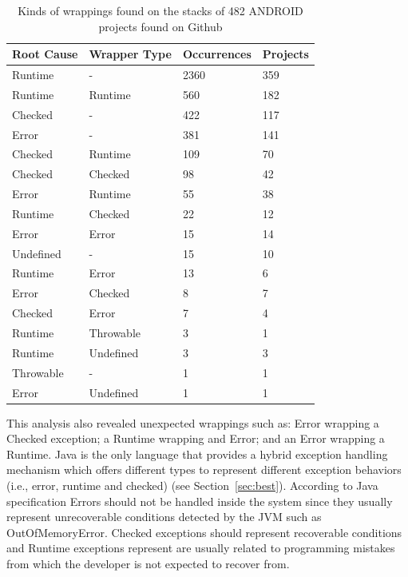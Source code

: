 \documentclass[conference]{IEEEtran}
\begin{document}
\begin{table}
\centering
\begin{tabular}{llll}
    \hline
    \bfseries{Root Cause} & \bfseries{Wrapper Type} & \bfseries{Occurrences} & \bfseries{Projects} \\
    \hline
     Runtime    & -   &  2360 & 359 \\

    Runtime   & Runtime & 560  & 182 \\
    
 Checked    &   -  & 422  & 117 \\
     Error    &   -   & 381  & 141 \\
   Checked &  Runtime   & 109  & 70  \\
    Checked   & Checked & 98   & 42  \\
   Error   &  Runtime   & 55   & 38  \\
   Runtime &  Checked   & 22   & 12  \\
    Error     & Error   & 15   & 14  \\
  Undefined    &  -  &  15   & 10  \\
   Runtime & Error     &  13   & 6 \\
  Error   & Checked   &  8    & 7 \\
    Checked &Error     &  7    & 4 \\
    Runtime &Throwable &  3    & 1 \\
   Runtime & Undefined &  3    & 3 \\
   Throwable    & -  &  1    & 1 \\
   Error   & Undefined &  1    & 1 \\
    \hline
  \end{tabular}
\caption{Kinds of wrappings found on the stacks of 482 ANDROID projects found on Github}
\label{tab:wrappingandroid}
\end{table}

This analysis also revealed unexpected wrappings such as: Error wrapping a Checked 
exception; a Runtime wrapping and Error; and an Error wrapping a Runtime.
Java is the only language that provides a hybrid exception handling mechanism
which offers  different types to represent different exception behaviors (i.e., error, 
runtime and checked) (see Section~\ref{sec:best}). According to Java specification Errors should not be
handled inside the system since they usually represent unrecoverable conditions
detected by the JVM such as OutOfMemoryError. Checked exceptions should
represent recoverable conditions and  Runtime exceptions represent are usually
related to programming mistakes from which the developer is not expected to recover
from. 
\end{document}
